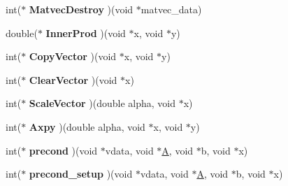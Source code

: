 \begin{DoxyCompactItemize}
\item 
\hypertarget{structhypre__GMRESFunctions_a88944720dcc96049ec5a34a56835fa7e}{}int($\ast$ {\bfseries Matvec\+Destroy} )(void $\ast$matvec\+\_\+data)\label{structhypre__GMRESFunctions_a88944720dcc96049ec5a34a56835fa7e}

\item 
\hypertarget{structhypre__GMRESFunctions_af5d2f0ca9db259d1df8cf374e918b14f}{}double($\ast$ {\bfseries Inner\+Prod} )(void $\ast$x, void $\ast$y)\label{structhypre__GMRESFunctions_af5d2f0ca9db259d1df8cf374e918b14f}

\item 
\hypertarget{structhypre__GMRESFunctions_a125ba36799e7b4fd4763f03d9d7848b8}{}int($\ast$ {\bfseries Copy\+Vector} )(void $\ast$x, void $\ast$y)\label{structhypre__GMRESFunctions_a125ba36799e7b4fd4763f03d9d7848b8}

\item 
\hypertarget{structhypre__GMRESFunctions_a389c2d1794fc943e853facb8bd7d4859}{}int($\ast$ {\bfseries Clear\+Vector} )(void $\ast$x)\label{structhypre__GMRESFunctions_a389c2d1794fc943e853facb8bd7d4859}

\item 
\hypertarget{structhypre__GMRESFunctions_ab02342df6e1a7a1bbb4a81d291e19b6c}{}int($\ast$ {\bfseries Scale\+Vector} )(double alpha, void $\ast$x)\label{structhypre__GMRESFunctions_ab02342df6e1a7a1bbb4a81d291e19b6c}

\item 
\hypertarget{structhypre__GMRESFunctions_a8c2d3e8fc7469044aa31fc0209eea79c}{}int($\ast$ {\bfseries Axpy} )(double alpha, void $\ast$x, void $\ast$y)\label{structhypre__GMRESFunctions_a8c2d3e8fc7469044aa31fc0209eea79c}

\item 
\hypertarget{structhypre__GMRESFunctions_abdff91e1fa97e0271b0bdb4ae0bbe5ec}{}int($\ast$ {\bfseries precond} )(void $\ast$vdata, void $\ast$\hyperlink{structA}{A}, void $\ast$b, void $\ast$x)\label{structhypre__GMRESFunctions_abdff91e1fa97e0271b0bdb4ae0bbe5ec}

\item 
\hypertarget{structhypre__GMRESFunctions_a7981377f981fe8e5372788b9fde9077a}{}int($\ast$ {\bfseries precond\+\_\+setup} )(void $\ast$vdata, void $\ast$\hyperlink{structA}{A}, void $\ast$b, void $\ast$x)\label{structhypre__GMRESFunctions_a7981377f981fe8e5372788b9fde9077a}

\end{DoxyCompactItemize}


